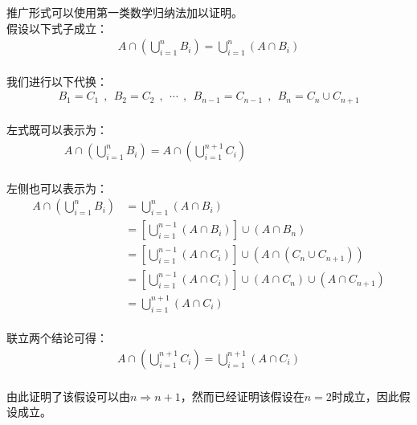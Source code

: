 \documentclass[UTF8]{ctexart}
\begin{document}
    推广形式可以使用第一类数学归纳法加以证明。\\[3mm]
    假设以下式子成立：
    \setcounter{equation}{0}
    \begin{align}
        A\cap\left(\bigcup_{i=1}^n B_i\right)=\bigcup_{i=1}^n(A\cap B_i)
    \end{align}\\
    我们进行以下代换：
    \begin{align}
        B_1=C_1~~,~~B_2=C_2~~,~~\cdots~~,~~B_{n-1}=C_{n-1}~~,~~B_n=C_n\cup C_{n+1}
    \end{align}\\
    左式既可以表示为：
    \begin{align}
        A\cap\left(\bigcup_{i=1}^n B_i\right)=A\cap\left(\bigcup_{i=1}^{n+1} C_i\right)~~~~~~~~~~~~~~~~~~~~~~~~~~~~~~~~~~~~~~~~~~~
    \end{align}\\
    左侧也可以表示为：
    \begin{align}
        A\cap\left(\bigcup_{i=1}^n B_i\right)
        &=\bigcup_{i=1}^n(A\cap B_i)\\[3mm]
        &=\left[\bigcup_{i=1}^{n-1}(A\cap B_i)\right]\cup(A\cap B_n)\\[3mm]
        &=\left[\bigcup_{i=1}^{n-1}(A\cap C_i)\right]\cup(A\cap (C_n\cup C_{n+1}))\\[3mm]
        &=\left[\bigcup_{i=1}^{n-1}(A\cap C_i)\right]\cup(A\cap C_n)\cup(A\cap C_{n+1})\\[3mm]
        &=\bigcup_{i=1}^{n+1}(A\cap C_i)
    \end{align}\\
    联立两个结论可得：
    \begin{align}
        A\cap\left(\bigcup_{i=1}^{n+1} C_i\right)=\bigcup_{i=1}^{n+1}(A\cap C_i)
    \end{align}\\
    由此证明了该假设可以由$n\Rightarrow n+1$，然而已经证明该假设在$n=2$时成立，因此假设成立。

\newpage
\end{document}
